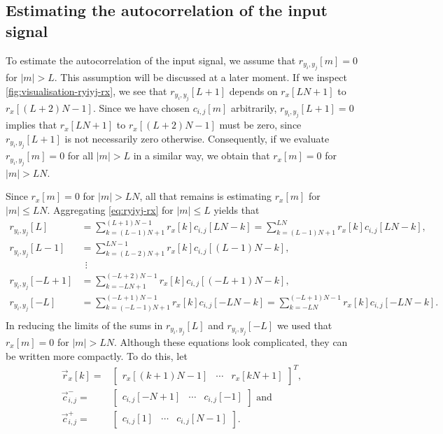 \documentclass[a4paper, openany, oneside]{memoir}
\begin{document}
\subsection{Estimating the autocorrelation of the input signal}
To estimate the autocorrelation of the input signal, we assume that $r_{y_i,y_j}[m]=0$ for $|m| > L$. This assumption will be discussed at a later moment. If we inspect \cref{fig:visualisation-ryiyj-rx}, we see that $r_{y_i,y_j}[L+1]$ depends on $r_x[LN+1]$ to $r_x[(L+2)N-1]$. Since we have chosen $c_{i,j}[m]$ arbitrarily, $r_{y_i,y_j}[L+1]=0$ implies that $r_x[LN+1]$ to $r_x[(L+2)N-1]$ must be zero, since $r_{y_i,y_j}[L+1]$ is not necessarily zero otherwise. Consequently, if we evaluate $r_{y_i,y_j}[m]=0$ for all $|m| > L$ in a similar way, we obtain that $r_x[m]=0$ for $|m| > LN$.

Since $r_x[m]=0$ for $|m| > LN$, all that remains is estimating $r_x[m]$ for $|m| \le LN$. Aggregating \cref{eq:ryiyj-rx} for $|m| \le L$ yields that
\begin{align*}
    r_{y_i,y_j}[L] &= \sum_{k=(L-1)N+1}^{(L+1)N-1}r_{x}[k]c_{i,j}[LN-k] = \sum_{k=(L-1)N+1}^{LN}r_{x}[k]c_{i,j}[LN-k], \\
    r_{y_i,y_j}[L-1] &= \sum_{k=(L-2)N+1}^{LN-1}r_{x}[k]c_{i,j}[(L-1)N-k], \\
    &~~\vdots \\
    r_{y_i,y_j}[-L+1] &= \sum_{k=-LN+1}^{(-L+2)N-1}r_{x}[k]c_{i,j}[(-L+1)N-k], \\
    r_{y_i,y_j}[-L] &= \sum_{k=(-L-1)N+1}^{(-L+1)N-1}r_{x}[k]c_{i,j}[-LN-k] = \sum_{k=-LN}^{(-L+1)N-1}r_{x}[k]c_{i,j}[-LN-k]. \\
\end{align*}
In reducing the limits of the sums in $r_{y_i,y_j}[L]$ and $r_{y_i,y_j}[-L]$ we used that $r_x[m]=0$ for $|m| > LN$. Although these equations look complicated, they can be written more compactly. To do this, let
\begin{align} \label{eq:def-rx}
    \vec{r}_x[k] =& \begin{bmatrix}
        r_x[(k+1)N-1] & \cdots & r_x[kN+1]
    \end{bmatrix}^T, \\
    \vec{c}^{-}_{i,j} =& \begin{bmatrix}
        c_{i,j}[-N+1] & \cdots & c_{i,j}[-1]
    \end{bmatrix} \text{ and } \nonumber \\
    \vec{c}^{+}_{i,j} =& \begin{bmatrix}
        c_{i,j}[1] & \cdots & c_{i,j}[N-1]
    \end{bmatrix}. \nonumber
\end{align}
\end{document}
